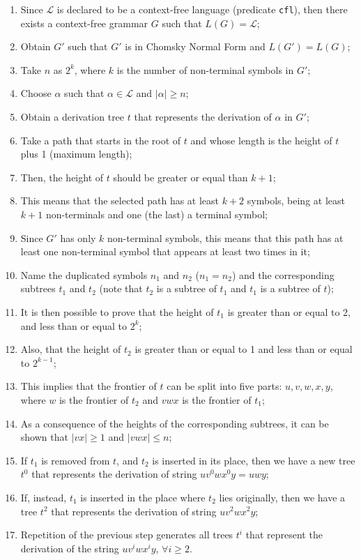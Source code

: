 \documentclass {elsarticle}
\begin{document}
\begin {enumerate}
\item Since $\mathcal {L}$ is declared to be a context-free language (predicate \texttt {cfl}), then there exists a context-free grammar $G$ such that $L(G) = \mathcal {L}$;
\item Obtain $G'$ such that $G'$ is in Chomsky Normal Form and $L(G')=L(G)$;
\item Take $n$ as $2^k$, where $k$ is the number of non-terminal symbols in $G'$;
\item Choose $\alpha$ such that $\alpha \in \mathcal {L}$ and $|\alpha| \ge n$;
\item Obtain a derivation tree $t$ that represents the derivation of $\alpha$ in $G'$;
\item Take a path that starts in the root of $t$ and whose length is the height of $t$ plus 1 (maximum length);
\item Then, the height of $t$ should be greater or equal than $k + 1$;
\item This means that the selected path has at least $k + 2$ symbols, being at least $k + 1$ non-terminals and one (the last) a terminal symbol;
\item Since $G'$ has only $k$ non-terminal symbols, this means that this path has at least one non-terminal symbol that appears at least two times in it;
\item Name the duplicated symbols $n_1$ and $n_2$ ($n_1 = n_2$) and the corresponding subtrees $t_1$ and $t_2$ (note that $t_2$ is a subtree of $t_1$ and $t_1$ is a subtree of $t$);
\item It is then possible to prove that the height of $t_1$ is greater than or equal to 2, and less than or equal to $2^k$;
\item Also, that the height of $t_2$  is greater than or equal to 1 and less than or equal to $2^{k-1}$;
\item This implies that the frontier of $t$ can be split into five parts: $u, v, w, x, y$, where $w$ is the frontier of $t_2$ and $vwx$ is the frontier of $t_1$;
\item As a consequence of the heights of the corresponding subtrees, it can be shown that $|vx| \ge 1$ and $|vwx| \le n$;
\item If $t_1$ is removed from $t$, and $t_2$ is inserted in its place, then we have a new tree $t^0$ that represents the derivation of string $uv^0wx^0y = uwy$;
\item If, instead, $t_1$ is inserted in the place where $t_2$ lies originally, then we have a tree $t^2$ that represents the derivation of string $uv^2wx^2y$;
\item Repetition of the previous step generates all trees $t^i$ that represent the derivation of the string $uv^iwx^iy$, $\forall i \ge 2$.
\end {enumerate}
\end{document}
